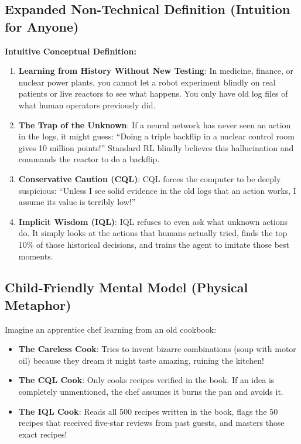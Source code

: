 \documentclass[11pt,a4paper]{article}
\theoremstyle{definition}
\begin{document}
\subsection{Expanded Non-Technical Definition (Intuition for Anyone)}
\textbf{Intuitive Conceptual Definition:}
\begin{enumerate}
    \item \textbf{Learning from History Without New Testing}: In medicine, finance, or nuclear power plants, you cannot let a robot experiment blindly on real patients or live reactors to see what happens. You only have old log files of what human operators previously did.
    \item \textbf{The Trap of the Unknown}: If a neural network has never seen an action in the logs, it might guess: ``Doing a triple backflip in a nuclear control room gives 10 million points!'' Standard RL blindly believes this hallucination and commands the reactor to do a backflip.
    \item \textbf{Conservative Caution (CQL)}: CQL forces the computer to be deeply suspicious: ``Unless I see solid evidence in the old logs that an action works, I assume its value is terribly low!''
    \item \textbf{Implicit Wisdom (IQL)}: IQL refuses to even ask what unknown actions do. It simply looks at the actions that humans actually tried, finds the top 10\% of those historical decisions, and trains the agent to imitate those best moments.
\end{enumerate}

\subsection{Child-Friendly Mental Model (Physical Metaphor)}
Imagine an apprentice chef learning from an old cookbook:
\begin{itemize}
    \item \textbf{The Careless Cook}: Tries to invent bizarre combinations (soup with motor oil) because they dream it might taste amazing, ruining the kitchen!
    \item \textbf{The CQL Cook}: Only cooks recipes verified in the book. If an idea is completely unmentioned, the chef assumes it burns the pan and avoids it.
    \item \textbf{The IQL Cook}: Reads all 500 recipes written in the book, flags the 50 recipes that received five-star reviews from past guests, and masters those exact recipes!
\end{itemize}
\end{document}

